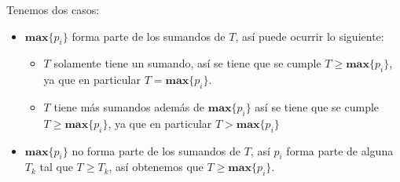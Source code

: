 \begin{frame}{\subsectiontitle}
    Tenemos dos casos:
    \begin{itemize}
        \item \(\mathbf{max}\{p_{i}\}\) forma parte de los sumandos de \(T\), así puede ocurrir lo siguiente:
        \begin{itemize}
            \item \(T\) solamente tiene un sumando, así se tiene que se cumple \(T \geq \mathbf{max}\{p_{i}\}\), ya que en particular \(T = \mathbf{max}\{p_{i}\}\).
            \item \(T\) tiene más sumandos además de \(\mathbf{max}\{p_{i}\}\) así se tiene que se cumple \(T \geq \mathbf{max}\{p_{i}\}\), ya que en particular \(T > \mathbf{max}\{p_{i}\}\)
        \end{itemize}
        \item \(\mathbf{max}\{p_{i}\}\) no forma parte de los sumandos de \(T\), así \(p_{i}\) forma parte de alguna \(T_{k}\) tal que \(T \geq T_{k}\), así obtenemos que 
        \(T \geq \mathbf{max}\{p_{i}\}\).
    \end{itemize}
\end{frame}

